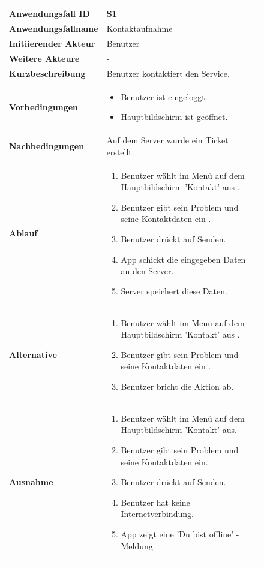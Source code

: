 \begin{figure}[H]
	\centering
	\begin{tabularx}{\textwidth}{ X | X }
		\textbf{Anwendungsfall ID} & S1 \\ \hline
		\textbf{Anwendungsfallname} & Kontaktaufnahme \\ \hline
		\textbf{Initiierender Akteur} & Benutzer \\ \hline
		\textbf{Weitere Akteure} & - \\ \hline
		\textbf{Kurzbeschreibung} & Benutzer kontaktiert den Service. \\ \hline
		\textbf{Vorbedingungen} &
		\begin {itemize}
			\item Benutzer ist eingeloggt.
			\item Hauptbildschirm ist geöffnet.
		\end{itemize}\\ \hline
		\textbf{Nachbedingungen} & Auf dem Server wurde ein Ticket erstellt. \\ \hline
		\textbf{Ablauf} &
		\begin{enumerate}
			\item Benutzer wählt im Menü auf dem Hauptbildschirm 'Kontakt' aus .
			\item Benutzer gibt sein Problem und seine Kontaktdaten ein .
			\item Benutzer drückt auf Senden.
			\item App schickt die eingegeben Daten an den Server. 
			\item Server speichert diese Daten.
		\end{enumerate} \\ \hline
		\textbf{Alternative} &
		\begin{enumerate}
			\item Benutzer wählt im Menü auf dem Hauptbildschirm 'Kontakt' aus .
			\item Benutzer gibt sein Problem und seine Kontaktdaten ein .
			\item Benutzer bricht die Aktion ab.
		\end{enumerate}  \\ \hline
		\textbf{Ausnahme} &
		\begin{enumerate}
			\item Benutzer wählt im Menü auf dem Hauptbildschirm 'Kontakt' aus.
			\item Benutzer gibt sein Problem und seine Kontaktdaten ein.
			\item Benutzer drückt auf Senden.
			\item Benutzer hat keine Internetverbindung.
			\item App zeigt eine 'Du bist offline' -Meldung.
		\end{enumerate} 
	\end{tabularx}
\end{figure}

